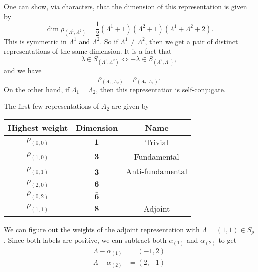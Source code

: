 \documentclass[a4paper]{article}
\begin{document}
\begin{eg}
  One can show, via characters, that the dimension of this representation is given by
  \[
    \dim \rho_{(\Lambda^1, \Lambda^2)} = \frac{1}{2} (\Lambda^1 + 1)(\Lambda^2 + 1)(\Lambda^1 + \Lambda^2 + 2).
  \]
  This is symmetric in $\Lambda^1$ and $\Lambda^2$. So if $\Lambda^1\not= \Lambda^2$, then we get a pair of distinct representations of the same dimension. It is a fact that
  \[
    \lambda \in S_{(\Lambda^1, \Lambda^2)} \Leftrightarrow -\lambda \in S_{(\Lambda^2, \Lambda^1)},
  \]
  and we have
  \[
    \rho_{(\Lambda_1, \Lambda_2)} = \bar{\rho}_{(\Lambda_2, \Lambda_1)}.
  \]
  On the other hand, if $\Lambda_1 = \Lambda_2$, then this representation is self-conjugate.

  The first few representations of $A_2$ are given by
  \begin{center}
    \begin{tabular}{ccc}
      \toprule
      Highest weight & Dimension & Name\\
      \midrule
      $\rho_{(0, 0)}$ & $\mathbf{1}$ & Trivial\\
      $\rho_{(1, 0)}$ & $\mathbf{3}$ & Fundamental\\
      $\rho_{(0, 1)}$ & $\bar{\mathbf{3}}$ & Anti-fundamental\\
      $\rho_{(2, 0)}$ & $\mathbf{6}$\\
      $\rho_{(0, 2)}$ & $\bar{\mathbf{6}}$\\
      $\rho_{(1, 1)}$ & $\mathbf{8}$ & Adjoint\\
      \bottomrule
    \end{tabular}
  \end{center}
  We can figure out the weights of the adjoint representation with $\Lambda = (1, 1) \in S_\rho$. Since both labels are positive, we can subtract both $\alpha_{(1)}$ and $\alpha_{(2)}$ to get
  \begin{align*}
    \Lambda - \alpha_{(1)} &= (-1, 2)\\
    \Lambda - \alpha_{(2)} &= (2, -1)
  \end{align*}
  \begin{center}
\end{center}
\end{eg}
\end{document}
